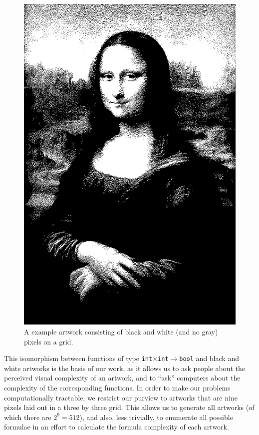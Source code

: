 \documentclass[11pt]{article}
\begin{document}
\begin{figure}
\begin{center}
\includegraphics[width=5in]{monalisa_mono.jpg}
\end{center}
\caption{A example artwork consisting of black and white (and no gray) pixels on a grid.}
\label{fig:monalisa}
\end{figure}

This isomorphism between functions of type {\tt int$\times$int$\to$bool} and
black and white artworks is the basis of our work, as it allows us to ask
people about the perceived visual complexity of an artwork, and to ``ask''
computers about the complexity of the corresponding functions.  In order to
make our problems computationally tractable, we restrict our purview to
artworks that are nine pixels laid out in a three by three grid.  This allows
us to generate all artworks (of which there are $2^9=512$), and also, less
trivially, to enumerate all possible formulae in an effort to calculate the
formula complexity of each artwork.
\end{document}
